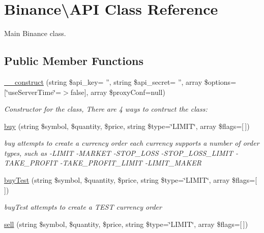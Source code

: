 \hypertarget{classBinance_1_1API}{\section{Binance\textbackslash{}A\-P\-I Class Reference}
\label{classBinance_1_1API}
}


Main Binance class.  


\subsection*{Public Member Functions}
\begin{DoxyCompactItemize}
\item 
\hyperlink{classBinance_1_1API_a97cadb5a2170a1b34114592fb9b6912c}{\-\_\-\-\_\-construct} (string \$api\-\_\-key= '', string \$api\-\_\-secret= '', array \$options=\mbox{[}\char`\"{}use\-Server\-Time\char`\"{}=$>$false\mbox{]}, array \$proxy\-Conf=null)
\begin{DoxyCompactList}\small\item\em Constructor for the class, There are 4 ways to contruct the class\-: \end{DoxyCompactList}\item 
\hyperlink{classBinance_1_1API_a98bf564a5ff752a2393bc626b222905e}{buy} (string \$symbol, \$quantity, \$price, string \$type=\char`\"{}L\-I\-M\-I\-T\char`\"{}, array \$flags=\mbox{[}$\,$\mbox{]})
\begin{DoxyCompactList}\small\item\em buy attempts to create a currency order each currency supports a number of order types, such as -\/\-L\-I\-M\-I\-T -\/\-M\-A\-R\-K\-E\-T -\/\-S\-T\-O\-P\-\_\-\-L\-O\-S\-S -\/\-S\-T\-O\-P\-\_\-\-L\-O\-S\-S\-\_\-\-L\-I\-M\-I\-T -\/\-T\-A\-K\-E\-\_\-\-P\-R\-O\-F\-I\-T -\/\-T\-A\-K\-E\-\_\-\-P\-R\-O\-F\-I\-T\-\_\-\-L\-I\-M\-I\-T -\/\-L\-I\-M\-I\-T\-\_\-\-M\-A\-K\-E\-R \end{DoxyCompactList}\item 
\hyperlink{classBinance_1_1API_a9e199a90097fbee4e89e2777534599b7}{buy\-Test} (string \$symbol, \$quantity, \$price, string \$type=\char`\"{}L\-I\-M\-I\-T\char`\"{}, array \$flags=\mbox{[}$\,$\mbox{]})
\begin{DoxyCompactList}\small\item\em buy\-Test attempts to create a T\-E\-S\-T currency order \end{DoxyCompactList}\item 
\hyperlink{classBinance_1_1API_aa5d028c98ced18dab5194009f4abdb0e}{sell} (string \$symbol, \$quantity, \$price, string \$type=\char`\"{}L\-I\-M\-I\-T\char`\"{}, array \$flags=\mbox{[}$\,$\mbox{]})

\end{DoxyCompactItemize}
